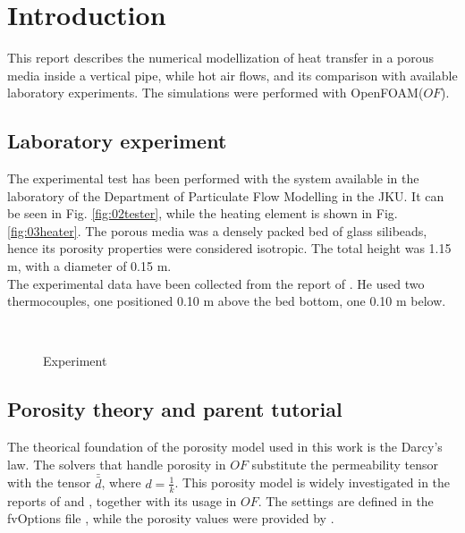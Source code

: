 
\section{Introduction}
\label{section:introduction}

This report describes the numerical modellization of heat transfer in a porous
media inside a vertical pipe, while hot air flows, and its comparison with available laboratory
experiments. The simulations were performed with OpenFOAM\textregistered ($OF$).

\subsection{Laboratory experiment}
\label{subsection:laboratoryexperiment}

The experimental test has been performed with the system available in the
laboratory of the Department of Particulate Flow Modelling in the JKU.
It can be seen in Fig. \ref{fig:02tester}, while the heating element is shown in
Fig. \ref{fig:03heater}. 
The porous media was a densely packed bed of glass silibeads, 
hence its porosity properties were considered isotropic.
The total height was
1.15 m, with a diameter of 0.15 m. \\
The experimental data have been collected from the report of
\textcite{ReportHofer}.
He used two thermocouples, one positioned 0.10 m above the bed bottom, one 0.10
m below.

\begin{figure}[!h]
\centering
{} \quad  %
{} \\  
\caption[Experiment]{Experiment}
\label{fig:experiments}
\end{figure}

\subsection{Porosity theory and parent tutorial}
\label{subsection:porositytheorytutorial}

The theorical foundation of the porosity model used in this work is the
Darcy's law.
The solvers that handle porosity in $OF$ substitute the
permeability tensor with the tensor $\bar{\bar{d}}$, where $d= \frac {1}{k}$.
This porosity model is widely investigated in the reports of
\textcite{ReportReveillon} and \textcite{Soulaine}, together with its usage in
$OF$.
The settings are defined in the fvOptions file \cite{OForgFv},
while the porosity values were provided by \textcite{Permeability}.


